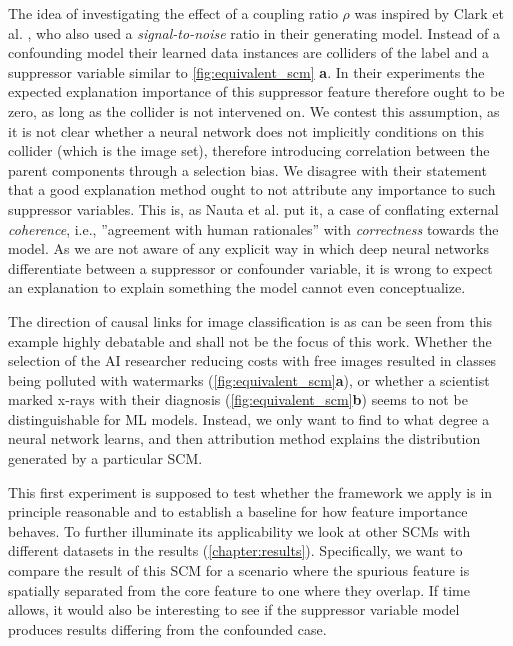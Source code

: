 The idea of investigating the effect of a coupling ratio $\rho$ was inspired by Clark et al. \cite{Clark2023}, who also used a \textit{signal-to-noise} ratio in their generating model. Instead of a confounding model their learned data instances are colliders of the label and a suppressor variable similar to \cref{fig:equivalent_scm} \textbf{a}. In their experiments the expected explanation importance of this suppressor feature therefore ought to be zero, as long as the collider is not intervened on. We contest this assumption, as it is not clear whether a neural network does not implicitly conditions on this collider (which is the image set), therefore introducing correlation between the parent components through a selection bias. We disagree with their statement that a good explanation method ought to not attribute any importance to such suppressor variables. This is, as Nauta et al. \cite{Nauta2023} put it, a case of conflating external \textit{coherence}, i.e., ''agreement with human rationales'' \cite{Atanasova2020} with \textit{correctness} towards the model. As we are not aware of any explicit way in which deep neural networks differentiate between a suppressor or confounder variable, it is wrong to expect an explanation to explain something the model cannot even conceptualize. 

The direction of causal links for image classification is as can be seen from this example highly debatable and shall not be the focus of this work. Whether the selection of the AI researcher reducing costs with free images resulted in classes being polluted with watermarks (\cref{fig:equivalent_scm}\textbf{a}), or whether a scientist marked x-rays with their diagnosis (\cref{fig:equivalent_scm}\textbf{b}) seems to not be distinguishable for ML models. 
Instead, we only want to find to what degree a neural network learns, and then attribution method explains the distribution generated by a particular SCM.

This first experiment is supposed to test whether the framework we apply is in principle reasonable and to establish a baseline for how feature importance behaves. To further illuminate its applicability we look at other SCMs with different datasets in the results (\cref{chapter:results}). Specifically, we want to compare the result of this SCM for a scenario where the spurious feature is spatially separated from the core feature to one where they overlap. 
If time allows, it would also be interesting to see if the suppressor variable model produces results differing from the confounded case.

